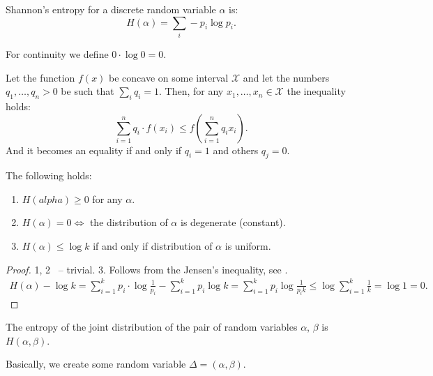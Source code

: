 \begin{definition}[1948]
    Shannon's entropy for a discrete random variable $\alpha$ is:
    \[
        H(\alpha) = \sum_i - p_i \log p_i.
    \]
\end{definition}
For continuity we define $0 \cdot \log 0 = 0$.

\begin{theorem}
    \label{thm:jensen}
    Let the function $f(x)$ be concave on some interval $\mathcal X$ and let the numbers $q_1, \ldots, q_n > 0$ be such that $\sum_i q_i = 1$.
    Then, for any $x_1, \ldots, x_n \in \mathcal X$ the inequality holds:
    \[
        \sum_{i = 1}^n q_i \cdot f(x_i) \leq f\left(\sum_{i = 1}^n q_i x_i\right).
    \]
    And it becomes an equality if and only if $q_i = 1$ and others $q_j = 0$.
\end{theorem}

\begin{lemma}
    The following holds:
    \begin{enumerate}
        \item $H(alpha) \geq 0$ for any $\alpha$.
        \item $H(\alpha) = 0 \iff $ the distribution of $\alpha$ is degenerate (constant).
        \item $H(\alpha) \leq \log k$ if and only if distribution of $\alpha$ is uniform.
    \end{enumerate}
\end{lemma}
\begin{proof}
    1, 2 ~-- trivial.
    3. Follows from the Jensen's inequality, see .
    \begin{align*}
        H(\alpha) - \log k = \sum_{i = 1}^k p_i \cdot \log \frac{1}{p_i} - \sum_{i = 1}^k p_i \log k = \sum_{i = 1}^k p_i \log \frac{1}{p_i k} \leq \log \sum_{i = 1}^k \frac{1}{k} = \log 1 = 0.
    \end{align*}
\end{proof}

\begin{definition}
    The entropy of the joint distribution of the pair of random variables $\alpha$, $\beta$ is  $H(\alpha, \beta)$.
\end{definition}
Basically, we create some random variable $\Delta = (\alpha, \beta)$.


